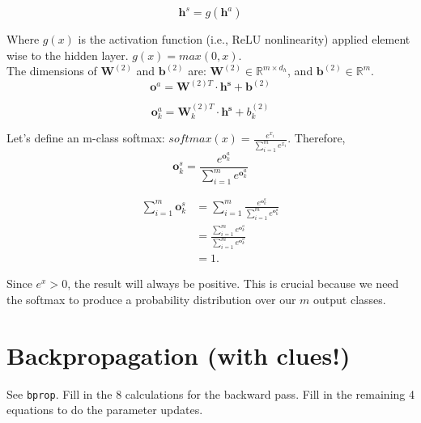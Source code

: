 \documentclass[reqno]{amsart}
\theoremstyle{definition}
\theoremstyle{remark}
\numberwithin{equation}{section}
\begin{document}
\begin{equation}
    \mathbf{h}^s = g(\mathbf{h}^a)
\end{equation}

Where $g(x)$ is the activation function (i.e., ReLU nonlinearity) applied
element wise to the hidden layer. $g(x) = max(0,x)$. \\

The dimensions of $\mathbf{W}^{(2)}$ and $\mathbf{b}^{(2)}$ are: $\mathbf{W}^{(2)} \in \mathbb{R}^{m \times d_h}$, and $\mathbf{b}^{(2)} \in \mathbb{R}^{m}$. \\

\begin{equation}
    \mathbf{o}^a = \mathbf{W}^{(2)T} \cdot \mathbf{h^s}+ \mathbf{b}^{(2)}
\end{equation}

\begin{equation}
    \mathbf{o}_k^a = \mathbf{W}_k^{(2)T} \cdot \mathbf{h^s}+ b_k^{(2)}
\end{equation}

Let's define an m-class softmax: $softmax(x) = \frac{e^{x_i}}{\sum_{i=1}^m e^{x_i}}$. Therefore, \\

\begin{equation}
    \mathbf{o}_k^s = \frac{e^{\mathbf{o}_k^a}}{\sum_{i=1}^m e^{\mathbf{o}_k^a}}
\end{equation}

\begin{align}
\sum_{i=1}^m \mathbf{o}_k^s
&= \sum_{i=1}^m \frac{e^{\mathbf{o}_k^a}}{\sum_{i=1}^m e^{\mathbf{o}_k^a}} \\
&= \frac{\sum_{i=1}^m e^{\mathbf{o}_k^a}}{\sum_{i=1}^m e^{\mathbf{o}_k^a}} \\
&= 1.
\end{align}

Since $e^x > 0$, the result will always be positive. This is crucial because
we need the softmax to produce a probability  distribution over our $m$ output
classes. \\

\section{Backpropagation (with clues!)}

See \texttt{bprop}. Fill in the 8 calculations for the backward pass. Fill
in the remaining 4 equations to do the parameter updates. \\
\end{document}
